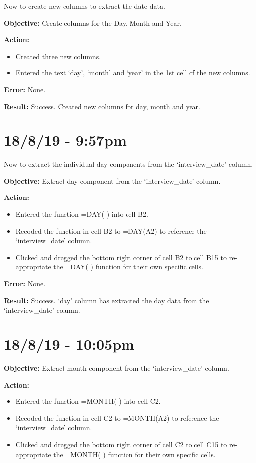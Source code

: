 \documentclass{article}
\begin{document}
Now to create new columns to extract the date data.

\textbf{Objective:} Create columns for the Day, Month and Year.

\textbf{Action:}
\begin{itemize}
    \item Created three new columns.
    \item Entered the text ‘day’, ‘month’ and ‘year’ in the 1st cell of the new columns.
\end{itemize}

\textbf{Error:} None.

\textbf{Result:} Success. Created new columns for day, month and year.

\section*{18/8/19 - 9:57pm}

Now to extract the individual day components from the ‘interview\_date’ column.

\textbf{Objective:} Extract day component from the ‘interview\_date’ column.

\textbf{Action:}
\begin{itemize}
    \item Entered the function =DAY( ) into cell B2.
    \item Recoded the function in cell B2 to =DAY(A2) to reference the ‘interview\_date’ column.
    \item Clicked and dragged the bottom right corner of cell B2 to cell B15 to re-appropriate the =DAY( ) function for their own specific cells.
\end{itemize}

\textbf{Error:} None.

\textbf{Result:} Success. ‘day’ column has extracted the day data from the ‘interview\_date’ column.

\section*{18/8/19 - 10:05pm}

\textbf{Objective:} Extract month component from the ‘interview\_date’ column.

\textbf{Action:}
\begin{itemize}
    \item Entered the function =MONTH( ) into cell C2.
    \item Recoded the function in cell C2 to =MONTH(A2) to reference the ‘interview\_date’ column.
    \item Clicked and dragged the bottom right corner of cell C2 to cell C15 to re-appropriate the =MONTH( ) function for their own specific cells.
\end{itemize}
\end{document}
